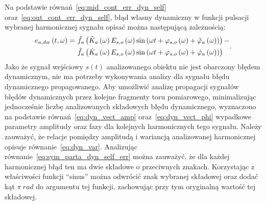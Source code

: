 Na podstawie równań~\eqref{eq:mid_cont_err_dyn_self} oraz~\eqref{eq:out_cont_err_dyn_self}, błąd własny dynamiczny w funkcji pulsacji wybranej harmonicznej sygnału opisać można następującą zależnością:
\begin{equation}
\begin{split}
e_{a,dw} \left(t,\omega\right) =~
& \tilde{f}_{a} \left(\tilde{K}_{a} \left(\omega\right) E_{s,o} \left(\omega\right) \sin \left( \omega t + \varphi_{s,o} \left(\omega\right) + \tilde{\varphi}_{a} \left(\omega\right) \right)\right) - \\
& \tilde{f}_{a} \left(\dot{K}_{a} \left(\omega\right) E_{s,o} \left(\omega\right) \sin \left( \omega t + \varphi_{s,o} \left(\omega\right) + \dot{\varphi}_{a} \left(\omega\right) \right)\right)
\end{split}
\label{eq:sym_parta_dyn_self_err}.
\end{equation}
Jako że sygnał wejściowy $s(t)$ analizowanego obiektu nie jest obarczony błędem dynamicznym, nie ma potrzeby wykonywania analizy dla sygnału błędu dynamicznego propagowanego. Aby umożliwić analizę propagacji sygnałów błędów dynamicznych przez kolejne fragmenty toru pomiarowego, minimalizując jednocześnie liczbę analizowanych składowych błędu dynamicznego, wyznaczono na podstawie równań~\eqref{eq:dyn_vect_amp} oraz~\eqref{eq:dyn_vect_phi} wypadkowe parametry amplitudy oraz fazy dla kolejnych harmonicznych tego sygnału. Należy zauważyć, że relacje pomiędzy amplitudą i wariancją analizowanej harmonicznej opisuje równanie~\eqref{eq:dyn_var}. Analizując równanie~\eqref{eq:sym_parta_dyn_self_err} można zauważyć, że dla każdej harmonicznej błąd ten ma dwie składowe o przeciwnych znakach. Korzystając z właściwości funkcji \enquote{sinus} można odwrócić znak wybranej składowej oraz dodać kąt $\pi~\unit{rad}$ do argumentu tej funkcji, zachowując przy tym oryginalną wartość tej składowej.

